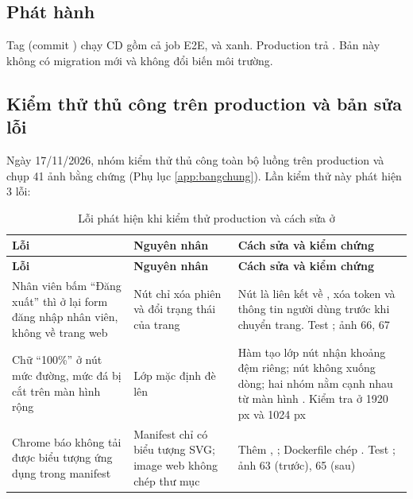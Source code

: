 
\subsection{Phát hành }
Tag  (commit ) chạy CD gồm cả job E2E, và xanh. Production trả . Bản này không có migration mới và không đổi biến môi trường.


\subsection{Kiểm thử thủ công trên production và bản sửa lỗi }
Ngày 17/11/2026, nhóm kiểm thử thủ công toàn bộ luồng trên production  và chụp 41 ảnh bằng chứng (Phụ lục \ref{app:bangchung}). Lần kiểm thử này phát hiện 3 lỗi:

\begin{longtable}{@{}L{3.6cm}L{4.4cm}L{5.8cm}@{}}
\caption{Lỗi phát hiện khi kiểm thử production và cách sửa ở }\label{tab:loi111}\\
\toprule
\textbf{Lỗi} & \textbf{Nguyên nhân} & \textbf{Cách sửa và kiểm chứng} \\ \midrule \endfirsthead
\toprule \textbf{Lỗi} & \textbf{Nguyên nhân} & \textbf{Cách sửa và kiểm chứng} \\ \midrule \endhead
\bottomrule \endfoot
Nhân viên bấm ``Đăng xuất'' thì ở lại form đăng nhập nhân viên, không về trang web & Nút chỉ xóa phiên và đổi trạng thái của trang  & Nút là liên kết về \code{/}, xóa token và thông tin người dùng trước khi chuyển trang. Test ; ảnh 66, 67 \\
Chữ ``100\%'' ở nút mức đường, mức đá bị cắt trên màn hình rộng & Lớp  mặc định đè lên  & Hàm tạo lớp nút nhận khoảng đệm riêng; nút không xuống dòng; hai nhóm nằm cạnh nhau từ màn hình . Kiểm tra ở 1920 px và 1024 px \\
Chrome báo không tải được biểu tượng ứng dụng trong manifest & Manifest chỉ có biểu tượng SVG; image web không chép thư mục  & Thêm , ; Dockerfile chép . Test ; ảnh 63 (trước), 65 (sau) \\
\end{longtable}

